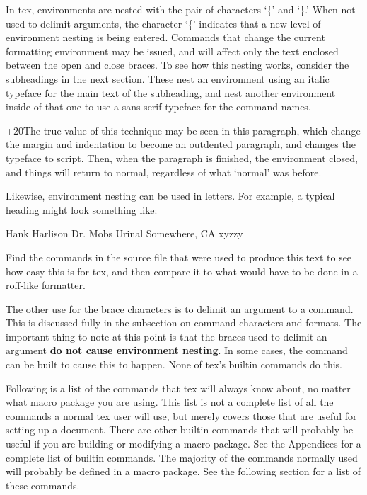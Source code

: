 In tex, environments are nested with the pair of characters `\{'
and `\}.'  When not used to delimit arguments, the character `\{'
indicates that a new level of environment nesting is being
entered. Commands that change the current formatting environment
may be issued, and will affect only the text enclosed between the
open and close braces. To see how this nesting works, consider the
subheadings in the next section. These nest an environment using
an italic typeface for the main text of the subheading, and nest
another environment inside of that one to use a sans serif
typeface for the command names.

{\lftmarg +20\sc The true value of this
technique may be seen in this paragraph, which change the margin
and indentation to become an outdented paragraph, and changes the
typeface to script. Then, when the paragraph is finished, the
environment closed, and things will return to normal, regardless
of what `normal' was before.}

Likewise, environment nesting can be used in letters. For
example, a typical heading might look something like:

{

Hank Harlison
Dr. Mobs Urinal
Somewhere, CA xyzzy
}


Find the commands in the source file that were used to produce
this text to see how easy this is for tex, and then compare it to
what would have to be done in a roff-like formatter.

The other use for the brace characters is to delimit an argument
to a command. This is discussed fully in the subsection on
command characters and formats. The important thing to note at
this point is that the braces used to delimit an argument {\bf do
not cause environment nesting}. In some cases, the command can be
built to cause this to happen.  None of tex's builtin commands do
this.


Following is a list of the commands that tex will always know
about, no matter what macro package you are using. This list is
not a complete list of all the commands a normal tex user will use,
but merely covers those that are useful for setting
up a document. There are other builtin commands that will
probably be useful if you are building or modifying a macro
package. See the Appendices for a complete list of builtin
commands. The majority of the commands normally used will
probably be defined in a macro package. See the following
section for a list of these commands.

